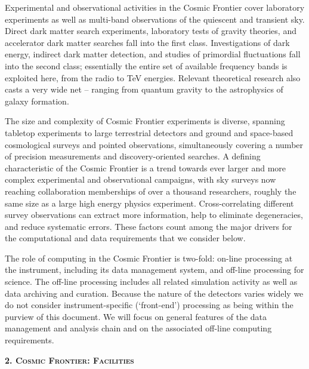 Experimental and observational activities in the Cosmic Frontier cover
laboratory experiments as well as multi-band observations of the
quiescent and transient sky. Direct dark matter search experiments,
laboratory tests of gravity theories, and accelerator dark matter
searches fall into the first class. Investigations of dark energy,
indirect dark matter detection, and studies of primordial fluctuations
fall into the second class; essentially the entire set of available
frequency bands is exploited here, from the radio to TeV
energies. Relevant theoretical research also casts a very wide net --
ranging from quantum gravity to the astrophysics of galaxy formation.

The size and complexity of Cosmic Frontier experiments is diverse,
spanning tabletop experiments to large terrestrial detectors and
ground and space-based cosmological surveys and pointed observations,
simultaneously covering a number of precision measurements and
discovery-oriented searches. A defining characteristic of the Cosmic
Frontier is a trend towards ever larger and more complex experimental
and observational campaigns, with sky surveys now reaching
collaboration memberships of over a thousand researchers, roughly the
same size as a large high energy physics experiment. Cross-correlating
different survey observations can extract more information, help to
eliminate degeneracies, and reduce systematic errors. These factors
count among the major drivers for the computational and data
requirements that we consider below.

\medskip


The role of computing in the Cosmic Frontier is two-fold: on-line
processing at the instrument, including its data management system,
and off-line processing for science. The off-line processing includes
all related simulation activity as well as data archiving and
curation. Because the nature of the detectors varies widely we do not
consider instrument-specific (`front-end') processing as being within
the purview of this document. We will focus on general features of the
data management and analysis chain and on the associated off-line
computing requirements.

\begin{center}
{\bf\scshape{2. Cosmic Frontier: Facilities}}
\end{center}

